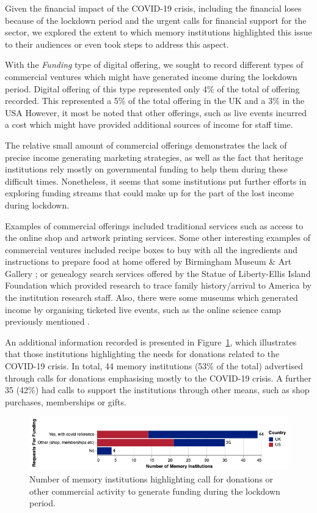 \documentclass{egpubl}
\begin{document}
Given the financial impact of the COVID-19 crisis, including the financial loses because of the lockdown period and the urgent calls for financial support for the sector, we explored the extent to which memory institutions highlighted this issue to their audiences or even took steps to address this aspect. 


With the \emph{Funding} type of digital offering, we sought to record different types of commercial ventures which might have generated income during the lockdown period. Digital offering of this type represented only 4\% of the total of offering recorded. This represented a 5\% of the total offering in the UK and a 3\% in the USA However, it most be noted that other offerings, such as live events incurred a cost which might have provided additional sources of income for staff time. 

The relative small amount of commercial offerings demonstrates the lack of precise income generating marketing strategies, as well as the fact that heritage institutions rely mostly on governmental funding to help them during these difficult times. Nonetheless, it seems that some institutions put further efforts in exploring funding streams that could make up for the part of the lost income during lockdown.


Examples of commercial offerings included traditional services such as access to the online shop and artwork printing services. Some other interesting examples of commercial ventures included recipe boxes to buy with all the ingredients and instructions to prepare food at home offered by Birmingham Museum \& Art Gallery ; or genealogy search services offered by the Statue of Liberty-Ellis Island Foundation  which provided research to trace family history/arrival to America by the institution research staff. Also, there were some museums which generated income by organising ticketed live events, such as the online science camp previously mentioned \cite{fieldmuseum}. 

An additional information recorded is presented in Figure~\ref{fig:funding}, which illustrates that those institutions highlighting the needs for donations related to the COVID-19 crisis. In total, 44 memory institutions (53\% of the total) advertised through calls for donations emphasising mostly to the COVID-19 crisis. A further 35 (42\%) had calls to support the institutions through other means, such as shop purchases, memberships or gifts.

\begin{figure}[h]
  \centering
  \includegraphics[width=\linewidth]{images/funding.png}
  \caption{\label{fig:funding}
            Number of memory institutions highlighting call for donations or other commercial activity to generate funding during the lockdown period.}
\end{figure}
\end{document}
